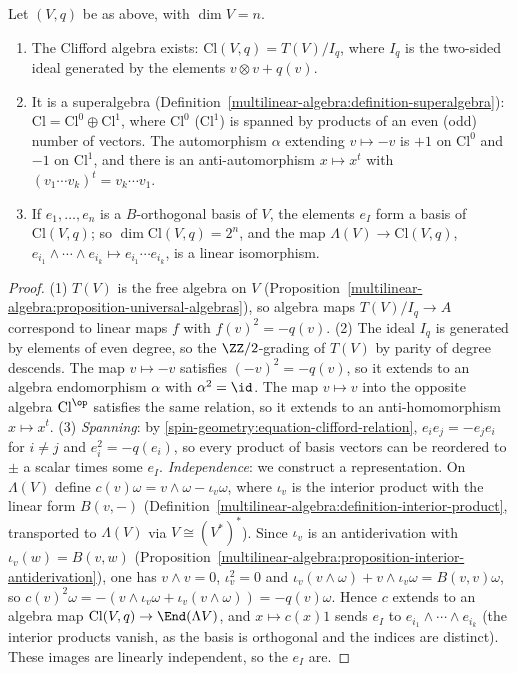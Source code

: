\begin{proposition}\label{spin-geometry:proposition-clifford-structure}
Let $(V, q)$ be as above, with $\dim V = n$.
\begin{enumerate}
\item The Clifford algebra exists: $\mathrm{Cl}(V, q) = T(V)/I_q$, where $I_q$ is the two-sided ideal generated by the elements $v \otimes v + q(v)$.
\item It is a superalgebra (Definition~\ref{multilinear-algebra:definition-superalgebra}): $\mathrm{Cl} = \mathrm{Cl}^0 \oplus \mathrm{Cl}^1$, where $\mathrm{Cl}^0$ ($\mathrm{Cl}^1$) is spanned by products of an even (odd)
number of vectors. The automorphism $\alpha$ extending $v \mapsto -v$ is $+1$ on $\mathrm{Cl}^0$ and $-1$ on $\mathrm{Cl}^1$, and there is an anti-automorphism $x \mapsto x^t$ with
$(v_1\cdots v_k)^t = v_k\cdots v_1$.
\item If $e_1, \ldots, e_n$ is a $B$-orthogonal basis of $V$, the elements $e_I$ form a basis of $\mathrm{Cl}(V, q)$; so $\dim\mathrm{Cl}(V, q) = 2^n$, and the map $\Lambda(V) \to \mathrm{Cl}(V, q)$,
$e_{i_1} \wedge \cdots \wedge e_{i_k} \mapsto e_{i_1}\cdots e_{i_k}$, is a linear isomorphism.
\end{enumerate}
\end{proposition}

\begin{proof}
(1) $T(V)$ is the free algebra on $V$ (Proposition~\ref{multilinear-algebra:proposition-universal-algebras}), so algebra maps $T(V)/I_q \to A$ correspond to linear maps $f$ with $f(v)^2 = -q(v)$.
(2) The ideal $I_q$ is generated by elements of even degree, so the $\ZZ/2$-grading of $T(V)$ by parity of degree descends. The map $v \mapsto -v$ satisfies $(-v)^2 = -q(v)$, so it extends to an algebra
endomorphism $\alpha$ with $\alpha^2 = \id$. The map $v \mapsto v$ into the opposite algebra $\mathrm{Cl}^{\op}$ satisfies the same relation, so it extends to an anti-homomorphism $x \mapsto x^t$.
(3) \emph{Spanning}: by \eqref{spin-geometry:equation-clifford-relation}, $e_ie_j = -e_je_i$ for $i \neq j$ and $e_i^2 = -q(e_i)$, so every product of basis vectors can be reordered to $\pm$ a scalar times some $e_I$.
\emph{Independence}: we construct a representation. On $\Lambda(V)$ define $c(v)\omega = v \wedge \omega - \iota_v\omega$, where $\iota_v$ is the interior product with the linear form $B(v, -)$
(Definition~\ref{multilinear-algebra:definition-interior-product}, transported to $\Lambda(V)$ via $V \cong (V^*)^*$). Since $\iota_v$ is an antiderivation with $\iota_v(w) = B(v, w)$
(Proposition~\ref{multilinear-algebra:proposition-interior-antiderivation}), one has $v \wedge v = 0$, $\iota_v^2 = 0$ and $\iota_v(v \wedge \omega) + v \wedge \iota_v\omega = B(v, v)\omega$, so
$c(v)^2\omega = -(v \wedge \iota_v\omega + \iota_v(v \wedge \omega)) = -q(v)\omega$. Hence $c$ extends to an algebra map $\mathrm{Cl}(V, q) \to \End(\Lambda V)$, and $x \mapsto c(x)1$ sends $e_I$ to
$e_{i_1} \wedge \cdots \wedge e_{i_k}$ (the interior products vanish, as the basis is orthogonal and the indices are distinct). These images are linearly independent, so the $e_I$ are.
\end{proof}

